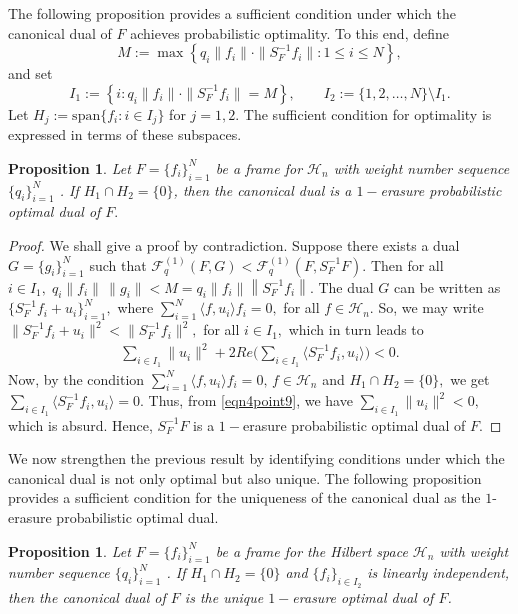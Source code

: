 \documentclass[final,1p,times]{elsarticle}
\newtheorem{prop}[thm]{Proposition}
\begin{document}
The following proposition provides a sufficient condition under which the canonical dual of \( F \) achieves probabilistic optimality. To this end, define
\[
M := \max \left\{ q_i\|f_i\| \cdot \|S_{F}^{-1} f_i\| : 1 \leq i \leq N \right\},
\]
and set
\[
I_1 := \left\{ i : q_i\|f_i\| \cdot \|S_{F}^{-1}f_i\| = M \right\}, 
\qquad 
I_2 := \{1,2,\ldots,N\} \setminus I_1.
\]
Let \( H_j := \mathrm{span}\{ f_i : i \in I_j \} \) for \( j = 1,2 \). The sufficient condition for optimality is expressed in terms of these subspaces.


\begin{prop}\label{prop4point1}
Let $F = \{f_i\}_{i=1}^N $ be a frame for $\mathcal{H}_n$ with weight number sequence $\{q_i\}_{i=1}^N$ . If $H_1 \cap H_2 = \{0\}$, then the canonical dual is a $1-$erasure probabilistic optimal dual of $F.$ 
\end{prop}
\begin{proof}
We shall give a proof by contradiction. Suppose there exists a dual $G = \{g_i\}_{i=1}^N $  such that  $\mathcal{F}_{q}^{(1)} (F,G) < \mathcal{F}_{q}^{(1)} (F, S_{F}^{-1} F) .$ Then for all $i \in I_1,\;	q_i\|f_i \|\,\|g_i \| < M =  q_i\|f_i \| \left\| S_{F}^{-1}f_i \right\| .$ The dual $G $ can be written as  $ \{ S_{F}^{-1}f_i + u_i \}_{i=1}^N ,$  where $\sum\limits_{i=1}^N \langle f,u_i \rangle f_i =0,$ for all $f \in \mathcal{H}_n.$
	So, we may write $\|S_{F}^{-1}f_i + u_i \|^2 < \|S_{F}^{-1}f_i \|^2,$ for all $i \in I_1,$ which in turn leads to
			\begin{align}\label{eqn4point9}
				\sum_{i \in I_1} \| u_i \|^2 + 2 Re \bigg( \sum_{i \in I_1} \langle  S_{F}^{-1}f_i ,u_i \rangle \bigg) < 0 .
			\end{align}
			Now, by the condition $\sum\limits_{i=1}^N  \langle f,u_i \rangle f_i =0,\,f \in \mathcal{H}_n$ and   $H_1 \cap H_2 = \{0\},$  we get  $\sum\limits_{i \in I_1} \langle  S_{F}^{-1}f_i ,u_i \rangle = 0.$  Thus, from \eqref{eqn4point9}, we have $ \sum\limits_{i \in I_1} \| u_i \|^2 < 0,$ which is absurd. Hence, $S_{F}^{-1}F$ is a $1-$erasure probabilistic optimal dual of $F.$
			
		\end{proof}

We now strengthen the previous result by identifying conditions under which the canonical dual is not only optimal but also unique.  The following proposition provides a sufficient condition for the uniqueness of the canonical dual as the $1$-erasure probabilistic optimal dual.

\begin{prop}\label{prop4point1}
Let \( F = \{f_i\}_{i=1}^N \) be a frame for the Hilbert space \( \mathcal{H}_n \) with weight number sequence $\{q_i\}_{i=1}^N$ . 
If \( H_1 \cap H_2 = \{0\} \) and \( \{f_i\}_{i \in I_2} \) is linearly independent,  then the canonical dual of \( F \) is the unique \( 1- \)erasure optimal dual of \( F \).
\end{prop}
\end{document}
